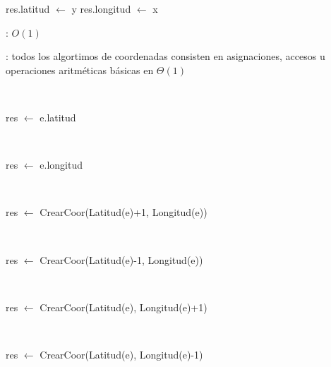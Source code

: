 \begin{Algoritmos}

	\begin{algorithm}[H]
		\NoCaptionOfAlgo
		\caption{}
		res.latitud $\leftarrow$ y
		res.longitud $\leftarrow$ x
	\end{algorithm}

	\complejidad: $O(1)$

	\justifcomp: todos los algortimos de coordenadas consisten en asignaciones, accesos u operaciones aritméticas básicas en $\Theta(1)$
	
	~

	\begin{algorithm}[H]
		\NoCaptionOfAlgo
		\caption{}
		res $\leftarrow$ e.latitud
	\end{algorithm}

	~

	\begin{algorithm}[H]
		\NoCaptionOfAlgo
		\caption{}
		res $\leftarrow$ e.longitud
	\end{algorithm}

	~

	\begin{algorithm}[H]
		\NoCaptionOfAlgo
		\caption{}
		res $\leftarrow$ CrearCoor(Latitud(e)+1, Longitud(e))
	\end{algorithm}

	~

	\begin{algorithm}[H]
		\NoCaptionOfAlgo
		\caption{}
		res $\leftarrow$ CrearCoor(Latitud(e)-1, Longitud(e))
	\end{algorithm}

	~

	\begin{algorithm}[H]
		\NoCaptionOfAlgo
		\caption{}
		res $\leftarrow$ CrearCoor(Latitud(e), Longitud(e)+1)
	\end{algorithm}

	~

	\begin{algorithm}[H]
		\NoCaptionOfAlgo
		\caption{}
		res $\leftarrow$ CrearCoor(Latitud(e), Longitud(e)-1)
	\end{algorithm}


\end{Algoritmos}

